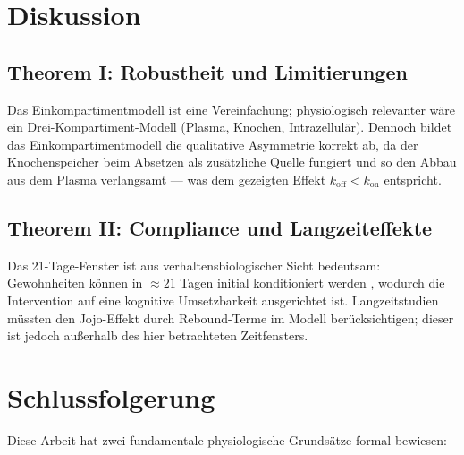 ﻿\documentclass[12pt,a4paper]{article}
\theoremstyle{plain}
\theoremstyle{definition}
\theoremstyle{remark}
\begin{document}
\section{Diskussion}
\label{sec:disc}

\subsection{Theorem I: Robustheit und Limitierungen}

Das Einkompartimentmodell ist eine Vereinfachung; physiologisch relevanter
wäre ein Drei-Kompartiment-Modell (Plasma, Knochen, Intrazellulär). Dennoch
bildet das Einkompartimentmodell die qualitative Asymmetrie korrekt ab, da
der Knochenspeicher beim Absetzen als zusätzliche Quelle fungiert und so
den Abbau aus dem Plasma verlangsamt --- was dem gezeigten Effekt $k_\text{off}
< k_\text{on}$ entspricht.

\subsection{Theorem II: Compliance und Langzeiteffekte}

Das 21-Tage-Fenster ist aus verhaltensbiologischer Sicht bedeutsam:
Gewohnheiten können in $\approx 21$ Tagen initial konditioniert werden
\cite{Maltz1960}, wodurch die Intervention auf eine kognitive Umsetzbarkeit
ausgerichtet ist. Langzeitstudien müssten den Jojo-Effekt durch Rebound-Terme
im Modell berücksichtigen; dieser ist jedoch außerhalb des hier betrachteten
Zeitfensters.

\section{Schlussfolgerung}
\label{sec:conc}

Diese Arbeit hat zwei fundamentale physiologische Grundsätze formal bewiesen:
\end{document}
